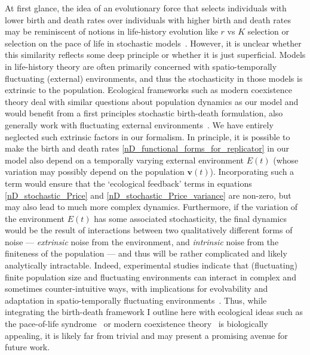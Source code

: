 At first glance, the idea of an evolutionary force that selects individuals with lower birth and death rates over individuals with higher birth and death rates may be reminiscent of notions in life-history evolution like $r$ vs $K$ selection or selection on the pace of life in stochastic models~\citep{stearns_evolution_1977}. However, it is unclear whether this similarity reflects some deep principle or whether it is just superficial. Models in life-history theory are often primarily concerned with spatio-temporally fluctuating (external) environments, and thus the stochasticity in those models is extrinsic to the population. Ecological frameworks such as modern coexistence theory deal with similar questions about population dynamics as our model and would benefit from a first principles stochastic birth-death formulation, also generally work with fluctuating external environments~\citep{chesson_multispecies_1994}. We have entirely neglected such extrinsic factors in our formalism. In principle, it is possible to make the birth and death rates \eqref{nD_functional_forms_for_replicator} in our model also depend on a temporally varying external environment $E(t)$ (whose variation may possibly depend on the population $\mathbf{v}(t)$). Incorporating such a term would ensure that the `ecological feedback' terms in equations \eqref{nD_stochastic_Price} and \eqref{nD_stochastic_Price_variance} are non-zero, but may also lead to much more complex dynamics. Furthermore, if the variation of the environment $E(t)$ has some associated stochasticity, the final dynamics would be the result of interactions between two qualitatively different forms of noise --- \emph{extrinsic} noise from the environment, and \emph{intrinsic} noise from the finiteness of the population --- and thus will be rather complicated and likely analytically intractable. Indeed, experimental studies indicate that (fluctuating) finite population size and fluctuating environments can interact in complex and sometimes counter-intuitive ways, with implications for evolvability and adaptation in spatio-temporally fluctuating environments~\citep{chavhan_larger_2020, chavhan_interplay_2021}. Thus, while integrating the birth-death framework I outline here with ecological ideas such as the pace-of-life syndrome~\citep{mathot_models_2018, wright_life-history_2019} or modern coexistence theory~\citep{chesson_multispecies_1994, johnson_resolving_2022} is biologically appealing, it is likely far from trivial and may present a promising avenue for future work.


